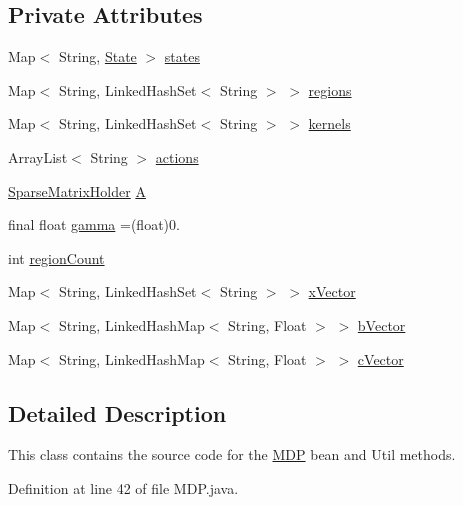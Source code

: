 \subsection*{Private Attributes}
\begin{DoxyCompactItemize}
\item 
Map$<$ String, \hyperlink{classmdp_1_1core_1_1_state}{State} $>$ \hyperlink{classmdp_1_1core_1_1_m_d_p_a62bf7674d88162db7d00cfd82603b24f}{states}
\item 
Map$<$ String, Linked\+Hash\+Set$<$ String $>$ $>$ \hyperlink{classmdp_1_1core_1_1_m_d_p_a79761e7b3bb0d7a083bee7183c992893}{regions}
\item 
Map$<$ String, Linked\+Hash\+Set$<$ String $>$ $>$ \hyperlink{classmdp_1_1core_1_1_m_d_p_ac185a95b0c9eb78b9d5a00b214696191}{kernels}
\item 
Array\+List$<$ String $>$ \hyperlink{classmdp_1_1core_1_1_m_d_p_a9da06680f73a486a6ee65c8208151e70}{actions}
\item 
\hyperlink{classmdp_1_1util_1_1_sparse_matrix_holder}{Sparse\+Matrix\+Holder} \hyperlink{classmdp_1_1core_1_1_m_d_p_ac75a611d9f5186893b70b8072bfa0804}{A}
\item 
final float \hyperlink{classmdp_1_1core_1_1_m_d_p_ab240c1d97d39d6f66cff0c8d06a57a69}{gamma} =(float)0.
\item 
int \hyperlink{classmdp_1_1core_1_1_m_d_p_ae2644b9387e09a5c2ab096c0bb519f8d}{region\+Count}
\item 
Map$<$ String, Linked\+Hash\+Set$<$ String $>$ $>$ \hyperlink{classmdp_1_1core_1_1_m_d_p_a073e9c6d6e349ae034c3cf220d754324}{x\+Vector}
\item 
Map$<$ String, Linked\+Hash\+Map$<$ String, Float $>$ $>$ \hyperlink{classmdp_1_1core_1_1_m_d_p_a16eff8bad86554cc9f97f674b1625c66}{b\+Vector}
\item 
Map$<$ String, Linked\+Hash\+Map$<$ String, Float $>$ $>$ \hyperlink{classmdp_1_1core_1_1_m_d_p_a80af7879a4ff33ac43034eaa934c480f}{c\+Vector}
\end{DoxyCompactItemize}


\subsection{Detailed Description}
This class contains the source code for the \hyperlink{classmdp_1_1core_1_1_m_d_p}{M\+D\+P} bean and Util methods. 

Definition at line 42 of file M\+D\+P.\+java.



